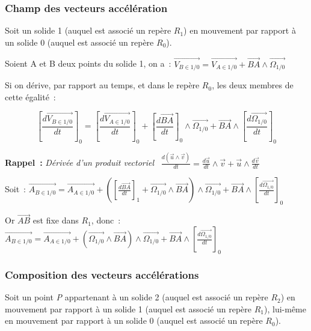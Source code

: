 \subsubsection{Champ des vecteurs
accélération}\label{champ-des-vecteurs-accuxe9luxe9ration}

Soit un solide 1 (auquel est associé un repère \(R_{1}\)) en mouvement
par rapport à un solide 0 (auquel est associé un repère \(R_{0}\)).

Soient A et B deux points du solide 1, on a~:
\(\overrightarrow{V_{B \in 1/0}} = \overrightarrow{V_{A \in 1/0}} + \overrightarrow{BA} \land \overrightarrow{\Omega_{1/0}}\)

Si on dérive, par rapport au temps, et dans le repère \(R_{0}\), les
deux membres de cette égalité~:

\[\left\lbrack \frac{d\overrightarrow{V_{B \in 1/0}}}{dt} \right\rbrack_{0} = \left\lbrack \frac{d\overrightarrow{V_{A \in 1/0}}}{dt} \right\rbrack_{0} + \left\lbrack \frac{d\overrightarrow{BA}}{dt} \right\rbrack_{0} \land \overrightarrow{\Omega_{1/0}} + \overrightarrow{BA} \land \left\lbrack \frac{d\overrightarrow{\Omega_{1/0}}}{dt} \right\rbrack_{0}\]

\textbf{Rappel~:} \emph{Dérivée d'un produit vectoriel~}
\(\frac{d(\overrightarrow{u} \land \overrightarrow{v})}{dt} = \frac{d\overrightarrow{u}}{dt} \land \overrightarrow{v} + \overrightarrow{u} \land \frac{d\overrightarrow{v}}{dt}\)

Soit~:
\(\overrightarrow{A_{B \in 1/0}} = \overrightarrow{A_{A \in 1/0}} + \left( \left\lbrack \frac{d\overrightarrow{BA}}{dt} \right\rbrack_{1} + \overrightarrow{\Omega_{1/0}} \land \overrightarrow{BA} \right) \land \overrightarrow{\Omega_{1/0}} + \overrightarrow{BA} \land \left\lbrack \frac{d\overrightarrow{\Omega_{1/0}}}{dt} \right\rbrack_{0}\)

Or \(\overrightarrow{AB}\) est fixe dans \(R_{1}\), donc~:
\(\overrightarrow{A_{B \in 1/0}} = \overrightarrow{A_{A \in 1/0}} + \left( \overrightarrow{\Omega_{1/0}} \land \overrightarrow{BA} \right) \land \overrightarrow{\Omega_{1/0}} + \overrightarrow{BA} \land \left\lbrack \frac{d\overrightarrow{\Omega_{1/0}}}{dt} \right\rbrack_{0}\)

\subsubsection{Composition des vecteurs
accélérations}\label{composition-des-vecteurs-accuxe9luxe9rations}

Soit un point \emph{P} appartenant à un solide 2 (auquel est associé un
repère \(R_{2}\)) en mouvement par rapport à un solide 1 (auquel est
associé un repère \(R_{1}\)), lui-même en mouvement par rapport à un
solide 0 (auquel est associé un repère \(R_{0}\)).

